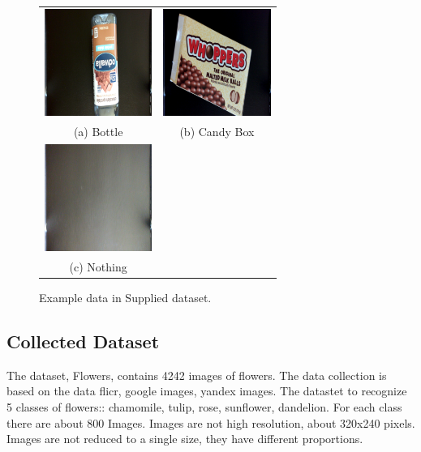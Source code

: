 \documentclass[10pt,journal,compsoc]{IEEEtran}
\begin{document}
\begin{figure}
    \centering
    \begin{tabular}{cc}
    \includegraphics[width=35mm]{images/example-bottle.png} &
    \includegraphics[width=35mm]{images/example-candy-box.png} \\
    (a) Bottle & (b) Candy Box \\[6pt]
    \hspace{0mm}
    \includegraphics[width=35mm]{images/example-nothing.png} \\
    (c) Nothing \\[6pt]
    \end{tabular}
    \caption{Example data in Supplied dataset.}
    \label{fig:supplied-examples}
\end{figure}

\subsection{Collected Dataset}

The dataset, Flowers, contains 4242 images of flowers. The data collection is based on the data flicr, google images, yandex images. The datastet to recognize 5 classes of flowers:: chamomile, tulip, rose, sunflower, dandelion. For each class there are about 800 Images. Images are not high resolution, about 320x240 pixels. Images are not reduced to a single size, they have different proportions.
\end{document}
